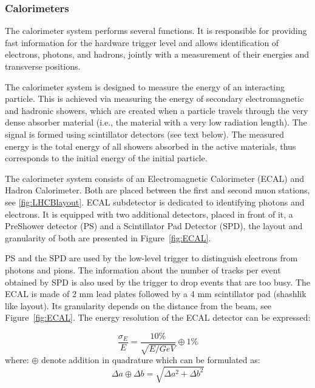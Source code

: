 \subsubsection{Calorimeters}

The calorimeter system performs several functions. It is responsible for providing fast information for the hardware trigger level and allows identification of electrons, photons, and hadrons, jointly with a measurement of their energies and transverse positions.

The calorimeter system is designed to measure the energy of an interacting particle. This is achieved via measuring the energy of secondary electromagnetic and hadronic showers, which are created when a particle travels through the very dense absorber material (i.e., the material with a very low radiation length). The signal is formed using scintillator detectors (see text below). The measured energy is the total energy of all showers absorbed in the active materials, thus corresponds to the initial energy of the initial particle. 

The calorimeter system consists of an Electromagnetic Calorimeter (ECAL) and Hadron Calorimeter.  Both are placed between the first and second muon stations, see \ref{fig:LHCBlayout}. ECAL subdetector is dedicated to identifying photons and electrons.  It is equipped with two additional detectors, placed in front of it, a PreShower detector (PS) and a Scintillator Pad Detector (SPD), the layout and granularity of both are presented in Figure~\ref{fig:ECAL}. 

PS and the SPD are used by the low-level trigger to distinguish electrons from photons and pions. The information about the number of tracks per event obtained by SPD is also used by the trigger to drop events that are too busy. 
The ECAL is made of 2 mm lead plates followed by a 4 mm scintillator pad (shashlik like layout).  Its granularity depends on the distance from the beam, see Figure~\ref{fig:ECAL}.
The energy resolution of the ECAL detector can be expressed: 

\begin{equation}
    \frac{\sigma_{E}}{E} = \frac{10\%}{\sqrt{E/GeV}} \oplus     1 \%
\end{equation}
where: $\oplus $ denote addition in quadrature which can be formulated as: 
\begin{equation}
   \Delta a\oplus \Delta b = \sqrt{\Delta a^2 + \Delta b^2} 
\end{equation}


